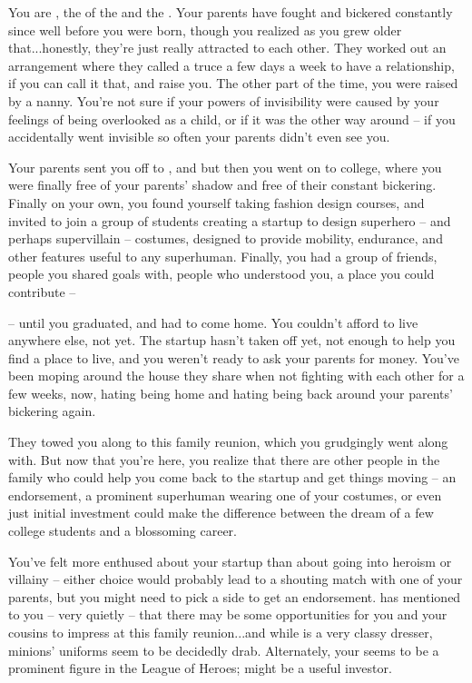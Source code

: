 \documentclass[char]{LRSguildcamp1}
\begin{document}
\name{\cGrad{}}
You are \cGrad{\intro}, the \cGrad{\offspring} of the \cOldest{\villain} \cOldest{\intro} and the \cOS{\hero} \cOS{\intro}.  Your parents have fought and bickered constantly since well before you were born, though you realized as you grew older that...honestly, they're just really attracted to each other.  They worked out an arrangement where they called a truce a few days a week to have a relationship, if you can call it that, and raise you.  The other part of the time, you were raised by a nanny.  You're not sure if your powers of invisibility were caused by your feelings of being overlooked as a child, or if it was the other way around -- if you accidentally went invisible so often your parents didn't even see you.  

Your parents sent you off to \pSuperSchool{}, and but then you went on to college, where you were finally free of your parents' shadow and free of their constant bickering.  Finally on your own, you found yourself taking fashion design courses, and invited to join a group of students creating a startup to design superhero -- and perhaps supervillain -- costumes, designed to provide mobility, endurance, and other features useful to any superhuman.  Finally, you had a group of friends, people you shared goals with, people who understood you, a place you could contribute --

-- until you graduated, and had to come home.  You couldn't afford to live anywhere else, not yet.  The startup hasn't taken off yet, not enough to help you find a place to live, and you weren't ready to ask your parents for money.  You've been moping around the house they share when not fighting with each other for a few weeks, now, hating being home and hating being back around your parents' bickering again.

They towed you along to this family reunion, which you grudgingly went along with.  But now that you're here, you realize that there are other people in the family who could help you come back to the startup and get things moving -- an endorsement, a prominent superhuman wearing one of your costumes, or even just initial investment could make the difference between the dream of a few college students and a blossoming career.

You've felt more enthused about your startup than about going into heroism or villainy -- either choice would probably lead to a shouting match with one of your parents, but you might need to pick a side to get an endorsement.  \cGrandma{} has mentioned to you -- very quietly -- that there may be some opportunities for you and your cousins to impress \cGrandma{\them} at this family reunion...and while \cGrandma{} \cGrandma{\themself} is a very classy dresser, \cGrandma{\their} minions' uniforms seem to be decidedly drab.  Alternately, your \cYoungest{\uncle} \cYoungest{} seems to be a prominent figure in the League of Heroes; \cYoungest{\they} might be a useful investor.
\end{document}
